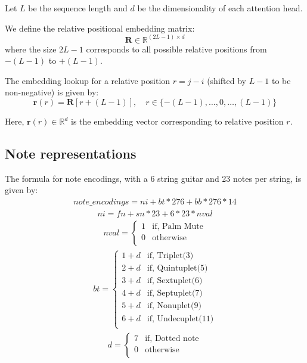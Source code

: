 \documentclass[twoside,11pt]{article}
\begin{document}
Let \( L \) be the sequence length and \( d \) be the dimensionality of each attention head.

We define the relative positional embedding matrix:
\[
\mathbf{R} \in \mathbb{R}^{(2L - 1) \times d}
\]
where the size \(2L - 1\) corresponds to all possible relative positions from \(- (L - 1)\) to \(+(L - 1)\).

The embedding lookup for a relative position \(r = j - i\) (shifted by \(L - 1\) to be non-negative) is given by:
\[
\mathbf{r}(r) = \mathbf{R}[r + (L - 1)], \quad r \in \{-(L-1), \ldots, 0, \ldots, (L-1)\}
\]

Here, \(\mathbf{r}(r) \in \mathbb{R}^d\) is the embedding vector corresponding to relative position \(r\).


\subsection{Note representations}
\label{sec:note-representations}
The formula for note encodings, with a 6 string guitar and 23 notes per string, is given by: 
\begin{align}
note\_encodings = ni + bt * 276 + bb * 276 * 14
\end{align}
\begin{align}
ni = fn + sn * 23 + 6 * 23 * nval
\end{align}
\begin{align}
nval =
\begin{cases}
1& \text{if, Palm Mute} \\
0 & \text{otherwise} \\
\end{cases}
\end{align}
\begin{align}
bt =
\begin{cases}
1 + d & \text{if, Triplet(3)} \\
2 + d & \text{if, Quintuplet(5)} \\
3 + d & \text{if, Sextuplet(6)} \\
4 + d & \text{if, Septuplet(7)} \\
5 + d & \text{if, Nonuplet(9)} \\
6 + d & \text{if, Undecuplet(11)}\\
\end{cases}
\end{align}
\begin{align}
d =
\begin{cases}
7& \text{if, Dotted note} \\
0 & \text{otherwise} \\
\end{cases}
\end{align}
\end{document}
